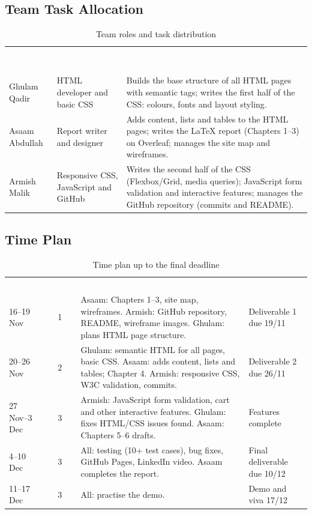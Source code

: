 \documentclass[10pt,a4paper]{article}
\newcommand{\hc}[1]{\textcolor{white}{\bfseries #1}}
\newcommand{\tbl}{\rowcolors{2}{white}{gkbg}\renewcommand{\arraystretch}{1.2}\footnotesize}
\begin{document}
\subsection{Team Task Allocation}
\begin{table}[H]
\centering
\caption{Team roles and task distribution}
\tbl
\begin{tabularx}{\textwidth}{@{}llY@{}}
\hc{Team member} & \hc{Role} & \hc{Responsibilities}\\
Ghulam Qadir & HTML developer and basic CSS & Builds the base structure of all HTML pages with semantic tags; writes the first half of the CSS: colours, fonts and layout styling.\\
Asaam Abdullah & Report writer and designer & Adds content, lists and tables to the HTML pages; writes the LaTeX report (Chapters 1--3) on Overleaf; manages the site map and wireframes.\\
Armish Malik & Responsive CSS, JavaScript and GitHub & Writes the second half of the CSS (Flexbox/Grid, media queries); JavaScript form validation and interactive features; manages the GitHub repository (commits and README).\\
\end{tabularx}
\end{table}

\subsection{Time Plan}
\begin{table}[H]
\centering
\caption{Time plan up to the final deadline}
\tbl
\begin{tabularx}{\textwidth}{@{}lcYl@{}}
\hc{Dates} & \hc{Phase} & \hc{Work (by member)} & \hc{Milestone}\\
16--19 Nov & 1 & Asaam: Chapters 1--3, site map, wireframes. Armish: GitHub repository, README, wireframe images. Ghulam: plans HTML page structure. & Deliverable 1 due 19/11\\
20--26 Nov & 2 & Ghulam: semantic HTML for all pages, basic CSS. Asaam: adds content, lists and tables; Chapter 4. Armish: responsive CSS, W3C validation, commits. & Deliverable 2 due 26/11\\
27 Nov--3 Dec & 3 & Armish: JavaScript form validation, cart and other interactive features. Ghulam: fixes HTML/CSS issues found. Asaam: Chapters 5--6 drafts. & Features complete\\
4--10 Dec & 3 & All: testing (10+ test cases), bug fixes, GitHub Pages, LinkedIn video. Asaam completes the report. & Final deliverable due 10/12\\
11--17 Dec & 3 & All: practise the demo. & Demo and viva 17/12\\
\end{tabularx}
\end{table}
\end{document}
